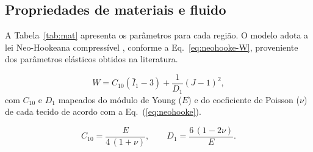 \documentclass[article, hidelinks,oneside,12pt]{abntex2}
\begin{document}

\subsection*{Propriedades de materiais e fluido}
\label{sec:met-materiais}

A Tabela~\ref{tab:mat} apresenta os parâmetros para cada região. O modelo adota a lei Neo-Hookeana compressível \cite{holzapfel2000, calculix}, conforme a Eq.~\ref{eq:neohooke-W}, proveniente dos parâmetros elásticos obtidos na literatura.

\begin{equation}
  W = C_{10}(\bar I_1 - 3) + \frac{1}{D_1}(J-1)^2,
  \label{eq:neohooke-W}
\end{equation}
com $C_{10}$ e $D_1$ mapeados do módulo de Young ($E$) e do coeficiente de Poisson ($\nu$) de cada tecido de acordo com a Eq.~(\ref{eq:neohooke}).

\begin{equation}
  C_{10} = \frac{E}{4\,(1+\nu)}, \qquad
  D_1 = \frac{6\,(1-2\nu)}{E}.
  \label{eq:neohooke}
\end{equation}
\end{document}
